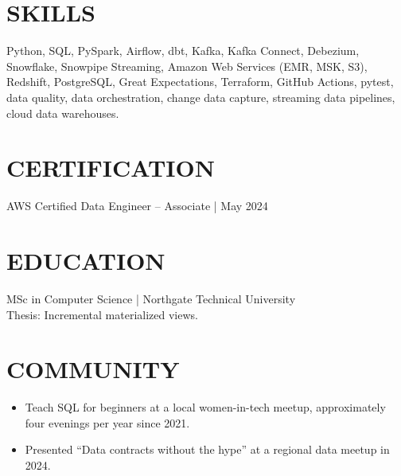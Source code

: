 \documentclass[11pt,a4paper]{article}
\begin{document}
\section*{SKILLS}
Python, SQL, PySpark, Airflow, dbt, Kafka, Kafka Connect, Debezium, Snowflake, Snowpipe Streaming, Amazon Web Services (EMR, MSK, S3), Redshift, PostgreSQL, Great Expectations, Terraform, GitHub Actions, pytest, data quality, data orchestration, change data capture, streaming data pipelines, cloud data warehouses.

\section*{CERTIFICATION}
AWS Certified Data Engineer – Associate | May 2024

\section*{EDUCATION}
MSc in Computer Science | Northgate Technical University\\
Thesis: Incremental materialized views.

\section*{COMMUNITY}
\begin{itemize}
\item Teach SQL for beginners at a local women-in-tech meetup, approximately four evenings per year since 2021.
\item Presented “Data contracts without the hype” at a regional data meetup in 2024.
\end{itemize}
\end{document}
